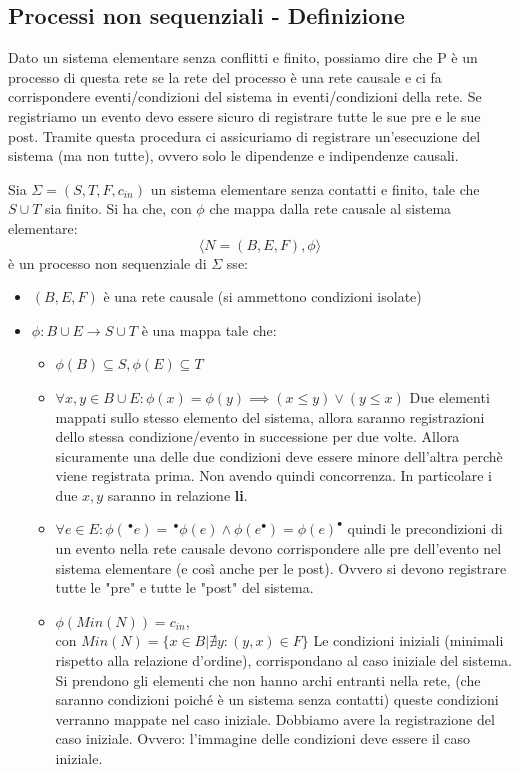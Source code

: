 \subsection{Processi non sequenziali - Definizione}
Dato un sistema elementare senza conflitti e finito, possiamo dire che P è un processo di questa rete
se la rete del processo è una rete causale e ci fa corrispondere eventi/condizioni del sistema in
eventi/condizioni della rete. Se registriamo un evento devo essere sicuro di registrare tutte le sue pre
e le sue post. Tramite questa procedura ci assicuriamo di registrare un'esecuzione del sistema (ma non tutte), ovvero solo le dipendenze e indipendenze causali.
\begin{definizione}
  Sia $\Sigma=(S, T, F, c_{in})$ un sistema elementare senza contatti e finito,
  tale che $S\cup T$ sia finito. Si ha che, con $\phi$ che mappa dalla rete
  causale al sistema elementare: 
  \[\langle N=(B, E, F), \phi\rangle\]
  è un processo non sequenziale di $\Sigma$ sse:
  \begin{itemize}
    \item $(B, E, F)$ è una rete causale (si ammettono condizioni isolate)
    \item $\phi:B\cup E\to S\cup T$ è una mappa tale che:
    \begin{itemize}
      \item $\phi(B)\subseteq S, \phi(E)\subseteq T$
      \item $\forall x, y\in B\cup E:\phi(x)=\phi(y)\implies (x\leq y)\lor (y\leq
      x)$ Due elementi mappati sullo stesso elemento del sistema, allora saranno registrazioni dello stessa condizione/evento in successione per due volte. Allora sicuramente una delle due condizioni deve essere minore dell'altra perchè viene registrata prima. Non avendo quindi concorrenza. In particolare i due $x,y$ saranno in relazione \textbf{li}.
      \item $\forall e\in E:\phi(\,^\bullet e)=\,^\bullet
      \phi(e)\land\phi(e^\bullet)=\phi(e)^\bullet$ quindi le precondizioni di un
      evento nella rete causale devono corrispondere alle pre dell'evento nel
      sistema elementare (e così anche per le post). Ovvero si devono registrare tutte le "pre" e tutte le "post" del sistema.
      \item $\phi(Min(N))=c_{in}$,\\ con $Min(N)=\{x\in B|\nexists
      y: (y, x)\in F\}$ 
      Le condizioni iniziali (minimali rispetto alla relazione d'ordine), corrispondano al caso iniziale del sistema. Si prendono gli elementi che non hanno archi entranti nella rete, (che saranno condizioni poiché è un sistema senza contatti) queste condizioni verranno mappate nel caso iniziale. Dobbiamo avere la registrazione del caso iniziale. Ovvero: l'immagine delle condizioni deve essere il caso iniziale.

\end{itemize}
\end{itemize}
\end{definizione}

